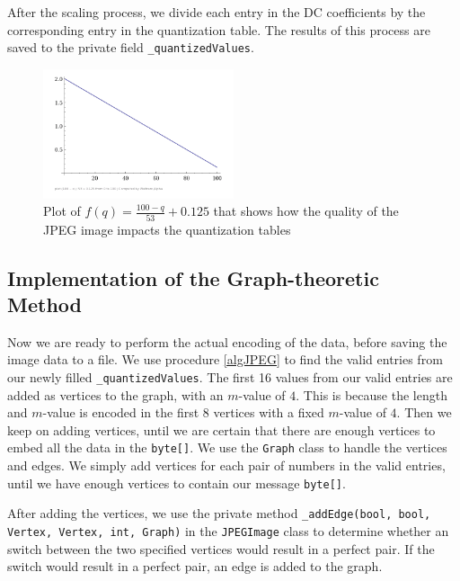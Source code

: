 After the scaling process, we divide each entry in the DC coefficients by the corresponding entry in the quantization table.
The results of this process are saved to the private field \lstinline|_quantizedValues|.

\begin{figure}
    \centering
    \includegraphics[width=0.5\textwidth]{figures/plotQuality.png}
    \caption{Plot of $f(q) = \frac{100-q}{53}+0.125$ that shows how the quality of the JPEG image impacts the quantization tables}
    \label{fig:plotQuality}
\end{figure}

\subsection{Implementation of the Graph-theoretic Method}

Now we are ready to perform the actual encoding of the data, before saving the image data to a file.
We use procedure \ref{algJPEG} to find the valid entries from our newly filled \lstinline|_quantizedValues|.
The first 16 values from our valid entries are added as vertices to the graph, with an $m$-value of $4$. This is because the length and $m$-value is encoded in the first 8 vertices with a fixed $m$-value of $4$.
Then we keep on adding vertices, until we are certain that there are enough vertices to embed all the data in the \lstinline|byte[]|.
We use the \lstinline|Graph| class to handle the vertices and edges.
We simply add vertices for each pair of numbers in the valid entries, until we have enough vertices to contain our message \lstinline|byte[]|.

After adding the vertices, we use the private method \lstinline|_addEdge(bool, bool, Vertex, Vertex, int, Graph)| in the \lstinline|JPEGImage| class to determine whether an switch between the two specified vertices would result in a perfect pair.
If the switch would result in a perfect pair, an edge is added to the graph.

